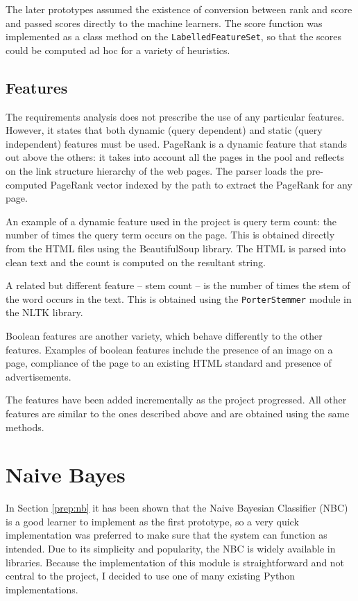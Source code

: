 \documentclass[12pt,notitlepage,twoside]{scrbook}
\begin{document}
The later prototypes assumed the existence of conversion between rank and score and passed
scores directly to the machine learners. The score function was implemented as a class method on the
\texttt{LabelledFeatureSet}, so that the scores could be computed ad hoc for a variety of
heuristics.

\subsection{Features}


The requirements analysis does not prescribe the use of any particular
features. However, it states that both dynamic (query dependent) and
static (query independent) features must be used. PageRank is a dynamic feature
that stands out above the others: it takes into account all the pages
in the pool and reflects on the link structure hierarchy of the web pages. 
The parser loads the pre-computed PageRank vector indexed by the path to
extract the PageRank for any page.

An example of a dynamic feature used in the project is query term count: the
number of times the query term occurs on the page. This is obtained directly
from the HTML files using the BeautifulSoup library.
The HTML is parsed into clean text and the count is
computed on the resultant string.

A related but different feature -- stem count -- is the number of times the
stem of the word occurs in the text. This is obtained using the \texttt{PorterStemmer}
module in the NLTK library.

Boolean features are another variety, which  behave differently to the other
features. Examples of boolean features include the presence of an image on a page, compliance
of the page to an existing HTML standard and presence of advertisements.

The features have been added incrementally as the project progressed. All other
features are similar to the ones described above and are obtained using the
same methods. 

\section{Naive Bayes}
In Section \ref{prep:nb} it has been shown that the Naive Bayesian Classifier (NBC) is a good learner
to implement as the first prototype, so a very quick implementation was
preferred to make sure that the system can function as intended. Due to
its simplicity and popularity, the NBC is widely available in 
libraries. Because the implementation of this module is straightforward and not
central to the project, I decided to use one of many existing Python
implementations. 
\end{document}
